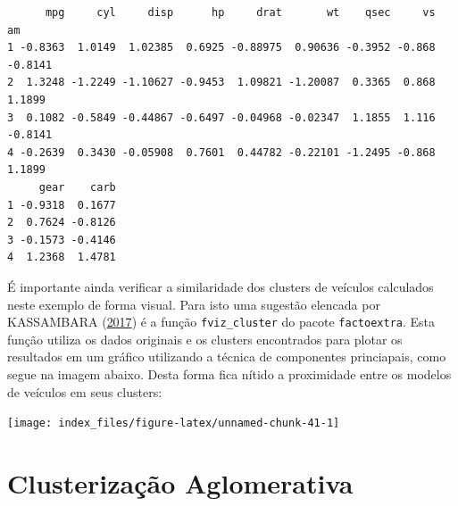 \documentclass[12pt,brazil,oneside]{book}
\newenvironment{Shaded}{\begin{snugshade}}{\end{snugshade}}
\newcommand{\CommentTok}[1]{\textcolor[rgb]{0.56,0.35,0.01}{\textit{#1}}}
\newcommand{\DataTypeTok}[1]{\textcolor[rgb]{0.13,0.29,0.53}{#1}}
\newcommand{\KeywordTok}[1]{\textcolor[rgb]{0.13,0.29,0.53}{\textbf{#1}}}
\newcommand{\NormalTok}[1]{#1}
\newcommand{\OtherTok}[1]{\textcolor[rgb]{0.56,0.35,0.01}{#1}}
\newcommand{\StringTok}[1]{\textcolor[rgb]{0.31,0.60,0.02}{#1}}
\begin{document}
\begin{verbatim}
      mpg     cyl     disp      hp     drat       wt    qsec     vs      am
1 -0.8363  1.0149  1.02385  0.6925 -0.88975  0.90636 -0.3952 -0.868 -0.8141
2  1.3248 -1.2249 -1.10627 -0.9453  1.09821 -1.20087  0.3365  0.868  1.1899
3  0.1082 -0.5849 -0.44867 -0.6497 -0.04968 -0.02347  1.1855  1.116 -0.8141
4 -0.2639  0.3430 -0.05908  0.7601  0.44782 -0.22101 -1.2495 -0.868  1.1899
     gear    carb
1 -0.9318  0.1677
2  0.7624 -0.8126
3 -0.1573 -0.4146
4  1.2368  1.4781
\end{verbatim}

É importante ainda verificar a similaridade dos clusters de veículos calculados neste exemplo de forma visual. Para isto uma sugestão elencada por KASSAMBARA (\protect\hyperlink{ref-Kassambara2017}{2017}) é a função \texttt{fviz\_cluster} do pacote \texttt{factoextra}. Esta função utiliza os dados originais e os clusters encontrados para plotar os resultados em um gráfico utilizando a técnica de componentes princiapais, como segue na imagem abaixo. Desta forma fica nítido a proximidade entre os modelos de veículos em seus clusters:

\begin{Shaded}
\end{Shaded}

\begin{center}\texttt{[image: index\_files/figure-latex/unnamed-chunk-41-1]} \end{center}

\hypertarget{clusterizacao-aglomerativa}{%
\section{Clusterização Aglomerativa}\label{clusterizacao-aglomerativa}}
\end{document}
